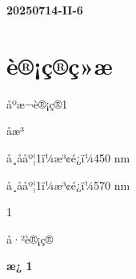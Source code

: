\documentclass[UTF8,10pt,a4paper,fontset=fandol]{ctexart}
\newcommand{\fieldvalue}[1]{#1}
\begin{document}
\newpage

\noindent\textbf{20250714-II-6}

\section*{è®¡ç®ç»æ}

\noindent
\fieldvalue{åºæ¬è®¡ç®1}

\noindent
\fieldvalue{åæ³}

\noindent
\fieldvalue{å¸ååº¦1ï¼æ³¢é¿ï¼450 nm}

\noindent
\fieldvalue{å¸ååº¦1ï¼æ³¢é¿ï¼570 nm}

\noindent
\fieldvalue{1}

\noindent
\fieldvalue{å·²è®¡ç®}

\medskip

\noindent
\textbf{æ¿ 1}
\end{document}
